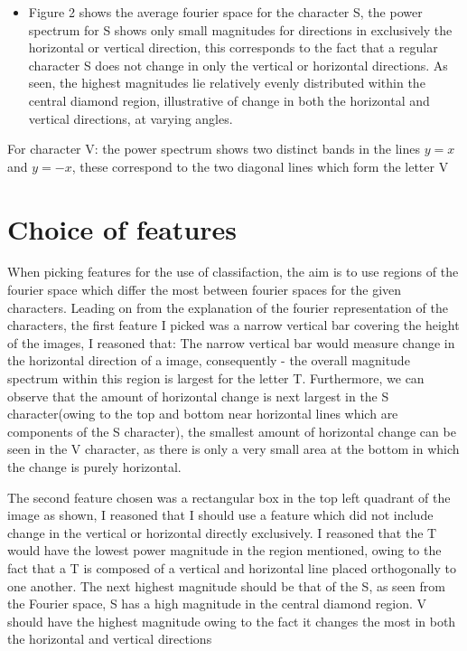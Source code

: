 \documentclass[a4paper,12px,twocolumn]{article}
\begin{document}
\begin{flushleft}
\begin{itemize}
    \item Figure 2 shows the average fourier space for the character S, the power spectrum for S shows only small magnitudes for directions
    in exclusively the horizontal or vertical direction, this corresponds to the fact that a regular character S does not change in only
    the vertical or horizontal directions. As seen, the highest magnitudes lie relatively evenly distributed within the central diamond
    region, illustrative of change in both the horizontal and vertical directions, at varying angles.

\end{itemize}


For character V: the power spectrum shows two distinct bands in the lines $ y = x$ and $y = -x$, these
correspond to the two diagonal lines which form the letter V

\smallskip




\section{Choice of features}

    When picking features for the use of classifaction, the aim is to use regions of the
    fourier space which differ the most between fourier spaces for the given characters.
    Leading on from the explanation of the fourier representation of the characters,
    the first feature I picked was a narrow vertical bar covering the height of the images, I reasoned that:
    The narrow vertical bar would measure change in the  horizontal direction of a image, consequently -  the overall
    magnitude spectrum within this region is largest for the letter T. Furthermore, we can observe that the amount of horizontal change
    is next largest in the S character(owing to the top and bottom near horizontal lines which are components of the S character),
    the smallest amount of horizontal change can be seen in the V character, as there is only a very small area at the bottom in which the change
    is purely horizontal.

    \bigskip

    The second feature chosen was a rectangular box in the top left quadrant of the image as shown, I reasoned that
    I should use a feature which did not include change in the vertical or horizontal directly exclusively.
    I reasoned that the T would have the lowest power magnitude in the region mentioned, owing to the fact that a T
    is composed of a vertical and horizontal line placed orthogonally to one another. The next highest magnitude should
    be that of the S, as seen from the Fourier space, S has a high magnitude in the central diamond region. V should have
    the highest magnitude owing to the fact it changes the most in both the horizontal and vertical directions



\end{flushleft}
\end{document}
